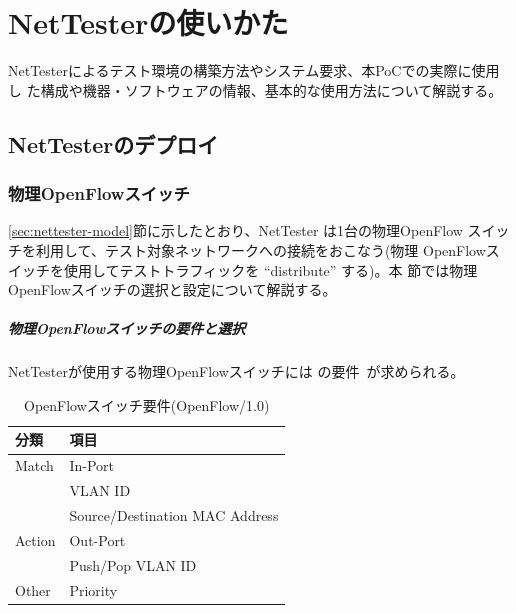 
\chapter{NetTesterの使いかた}
\label{chap:nettester-usage}

NetTesterによるテスト環境の構築方法やシステム要求、本PoCでの実際に使用し
た構成や機器・ソフトウェアの情報、基本的な使用方法について解説する。

 \section{NetTesterのデプロイ}
 \label{sec:nettester-deployment}

  \subsection{物理OpenFlowスイッチ}
  \label{sec:nettester-deploy-psw}


\ref{sec:nettester-model}節に示したとおり、NetTester は1台の物理OpenFlow
スイッチを利用して、テスト対象ネットワークへの接続をおこなう(物理
OpenFlowスイッチを使用してテストトラフィックを ``distribute'' する)。本
節では物理OpenFlowスイッチの選択と設定について解説する。

    \paragraph{物理OpenFlowスイッチの要件と選択}
NetTesterが使用する物理OpenFlowスイッチには
の要件~\cite{l1pjpoc}が求められる。

\begin{table}[h]
 \centering
 \caption{OpenFlowスイッチ要件(OpenFlow/1.0)}
 \label{tab:ofs-requirement}
 \begin{tabular}{l|l}
  \hline
  分類 & 項目 \\
  \hline
  \hline
  Match  & In-Port \\ \cline{2-2}
         & VLAN ID \\ \cline{2-2}
         & Source/Destination MAC Address \\ \hline
  Action & Out-Port \\ \cline{2-2}
         & Push/Pop VLAN ID \\ \hline
  Other & Priority \\
  \hline
 \end{tabular}
\end{table}

